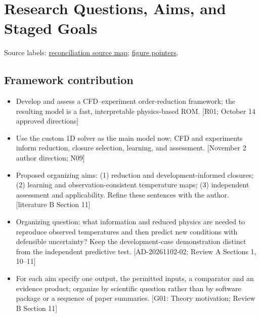 \section{Research Questions, Aims, and Staged Goals}
\noindent\small Source labels: \href{run:doc_support/reconciliation/2026-11-02/SOURCES.md}{reconciliation source map}; \href{run:doc_support/reconciliation/2026-11-02/FIGURE_POINTERS.md}{figure pointers}.\normalsize

\subsection{Framework contribution}
\begin{itemize}[leftmargin=*]
\item Develop and assess a CFD--experiment order-reduction framework; the resulting model is a fast, interpretable physics-based ROM. [R01; October 14 approved directions]
\item Use the custom 1D solver as the main model now; CFD and experiments inform reduction, closure selection, learning, and assessment. [November 2 author direction; N09]
\item Proposed organizing aims: (1) reduction and development-informed closures; (2) learning and observation-consistent temperature maps; (3) independent assessment and applicability. Refine these sentences with the author. [literature B Section 11]
\item Organizing question: what information and reduced physics are needed to reproduce observed temperatures and then predict new conditions with defensible uncertainty? Keep the development-case demonstration distinct from the independent predictive test. [AD-20261102-02; Review A Sections 1, 10--11]
\item For each aim specify one output, the permitted inputs, a comparator and an evidence product; organize by scientific question rather than by software package or a sequence of paper summaries. [G01: Theory motivation; Review B Section 11]
\end{itemize}


